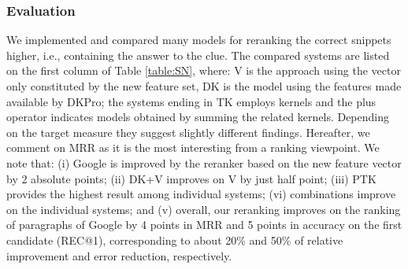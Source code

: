 \documentclass{wileysev}
\begin{document}
\subsubsection{Evaluation}

We implemented and compared many models for reranking the correct snippets higher, i.e., containing the answer to the clue. The compared systems are listed on the first column of Table \ref{table:SN}, where: V is the approach using the vector only constituted by the new feature set, DK is the model using the features made available by DKPro; the systems ending in TK employs kernels and the plus operator indicates models obtained by summing the related kernels.
Depending on the target measure they suggest slightly different findings. Hereafter, we comment on MRR as it is the most interesting from a ranking viewpoint. We note that: (i) Google is improved by the reranker based on the new feature vector by 2 absolute points; (ii)  DK+V improves on V by just half point; (iii) PTK provides the highest result among individual systems; (vi) combinations improve on the individual systems; and (v) overall, our reranking improves on the ranking of paragraphs of Google by 4 points in MRR and 5 points in accuracy on the first candidate (REC@1), corresponding to about 20\% and 50\% of relative improvement and error reduction, respectively.
\end{document}
